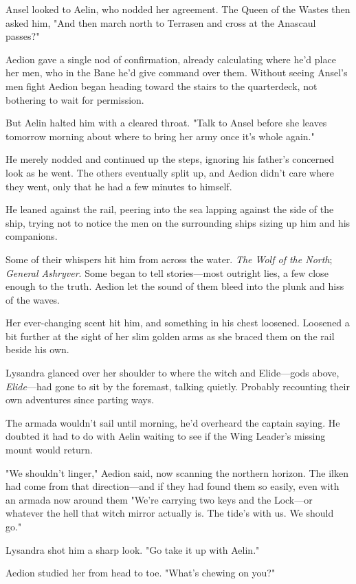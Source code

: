 Ansel looked to Aelin, who nodded her agreement. The Queen of the Wastes then asked him, "And then march north to Terrasen and cross at the Anascaul passes?"

Aedion gave a single nod of confirmation, already calculating where he'd place her men, who in the Bane he'd give command over them. Without seeing Ansel's men fight  Aedion began heading toward the stairs to the quarterdeck, not bothering to wait for permission.

But Aelin halted him with a cleared throat. "Talk to Ansel before she leaves tomorrow morning about where to bring her army once it's whole again."

He merely nodded and continued up the steps, ignoring his father's concerned look as he went. The others eventually split up, and Aedion didn't care where they went, only that he had a few minutes to himself.

He leaned against the rail, peering into the sea lapping against the side of the ship, trying not to notice the men on the surrounding ships sizing up him and his companions.

Some of their whispers hit him from across the water. \emph{The Wolf of the North}; \emph{General Ashryver}. Some began to tell stories---most outright lies, a few close enough to the truth. Aedion let the sound of them bleed into the plunk and hiss of the waves.

Her ever-changing scent hit him, and something in his chest loosened. Loosened a bit further at the sight of her slim golden arms as she braced them on the rail beside his own.

Lysandra glanced over her shoulder to where the witch and Elide---gods above, \emph{Elide}---had gone to sit by the foremast, talking quietly. Probably recounting their own adventures since parting ways.

The armada wouldn't sail until morning, he'd overheard the captain saying. He doubted it had to do with Aelin waiting to see if the Wing Leader's missing mount would return.

"We shouldn't linger," Aedion said, now scanning the northern horizon. The ilken had come from that direction---and if they had found them so easily, even with an armada now around them  "We're carrying two keys and the Lock---or whatever the hell that witch mirror actually is. The tide's with us. We should go."

Lysandra shot him a sharp look. "Go take it up with Aelin."

Aedion studied her from head to toe. "What's chewing on you?"

